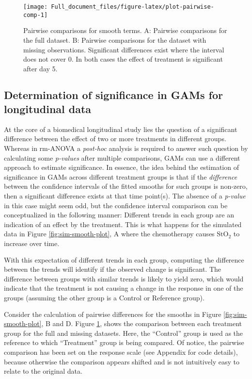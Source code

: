 \documentclass[
]{article}
\begin{document}
\begin{figure}[H]

{\centering \texttt{[image: Full\_document\_files/figure-latex/plot-pairwise-comp-1]} 

}

\caption{Pairwise comparisons for smooth terms. A: Pairwise comparisons for the full dataset. B: Pairwise comparisons for the dataset with missing observations. Significant differences exist where the interval does not cover 0. In both cases the effect of treatment is significant after day 5.}\label{fig:plot-pairwise-comp}
\end{figure}

\hypertarget{GAM-significance}{%
\subsection{Determination of significance in GAMs for longitudinal data}\label{GAM-significance}}

At the core of a biomedical longitudinal study lies the question of a significant difference between the effect of two or more treatments in different groups. Whereas in rm-ANOVA a \emph{post-hoc} analysis is required to answer such question by calculating some \emph{p-values} after multiple comparisons, GAMs can use a different approach to estimate significance. In essence, the idea behind the estimation of significance in GAMs across different treatment groups is that if the \emph{difference} between the confidence intervals of the fitted smooths for such groups is non-zero, then a significant difference exists at that time point(s). The absence of a \emph{p-value} in this case might seem odd, but the confidence interval comparison can be conceptualized in the following manner: Different trends in each group are an indication of an effect by the treatment. This is what happens for the simulated data in Figure \ref{fig:sim-smooth-plot}, A where the chemotherapy causes \(\mbox{StO}_2\) to increase over time.

With this expectation of different trends in each group, computing the difference between the trends will identify if the observed change is significant. The difference between groups with similar trends is likely to yield zero, which would indicate that the treatment is not causing a change in the response in one of the groups (assuming the other group is a Control or Reference group).

Consider the calculation of pairwise differences for the smooths in Figure \ref{fig:sim-smooth-plot}, B and D. Figure \ref{fig:plot-pairwise-comp}, shows the comparison between each treatment group for the full and missing datasets. Here, the ``Control'' group is used as the reference to which ``Treatment'' group is being compared. Of notice, the pairwise comparison has been set on the response scale (see Appendix for code details), because otherwise the comparison appears shifted and is not intuitively easy to relate to the original data.
\end{document}
